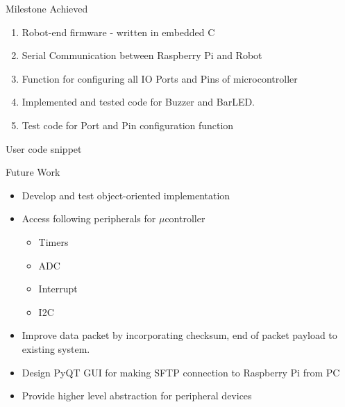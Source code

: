 \documentclass[10pt,handout,english]{beamer}
\begin{document}
\begin{frame}{Milestone Achieved}
\begin{enumerate}
\item Robot-end firmware - written in embedded C
\item Serial Communication between Raspberry Pi and Robot
\item Function for configuring all IO Ports and Pins of microcontroller
\item Implemented and tested code for Buzzer and BarLED.  
\item Test code for Port and Pin configuration function
\end{enumerate}

\end{frame}
\begin{frame}{User code snippet}
	
\end{frame}
\begin{frame}{Future Work}
\begin{itemize}
\item Develop and test object-oriented implementation
\item Access following peripherals for ${\mu}$controller
	\begin{itemize}
	\item Timers
	\item ADC
	\item Interrupt
	\item I2C
	\end{itemize}
\item Improve data packet by incorporating checksum, end of packet payload to existing system.
\item Design PyQT GUI for making SFTP connection to Raspberry Pi from PC
\item Provide higher level abstraction for peripheral devices  
\end{itemize}

\end{frame}
\end{document}
